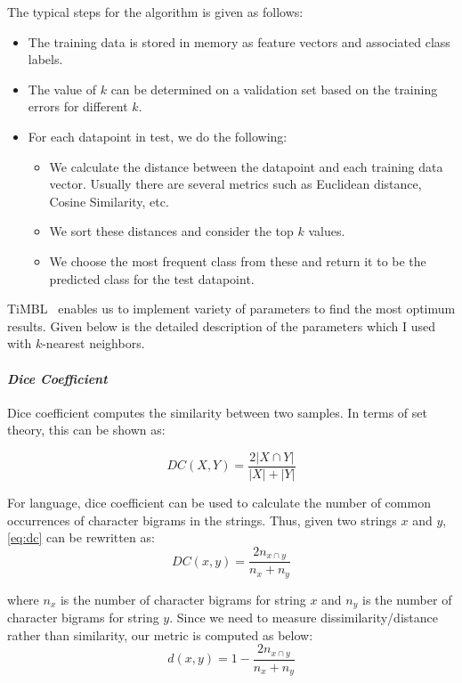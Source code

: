  The typical steps for the algorithm is given as follows:

\begin{itemize}
    \item  The training data is stored in memory as feature vectors and associated class labels.
    \item The value of $k$ can be determined on a validation set based on the training errors for different $k$.
    \item For each datapoint in test, we do the following:
    \begin{itemize}
        \item We calculate the distance between the datapoint and each training data vector. Usually there are several metrics such as Euclidean distance, Cosine Similarity, etc.
        \item We sort these distances and consider the top $k$ values. 
        \item We choose the most frequent class from these and return it to be the predicted class for the test datapoint.
    \end{itemize}
\end{itemize}

TiMBL~\citep{daelemans1998timbl} enables us to implement variety of parameters to find the most optimum results. Given below is the detailed description of the parameters which I used with $k$-nearest neighbors.

\paragraph*{\textit{Dice Coefficient}}

Dice coefficient computes the similarity between two samples. In terms of set theory, this can be shown as:

\begin{equation} \label{eq:dc}
    DC(X,Y) ={\frac {2|X\cap Y|}{|X|+|Y|}}
\end{equation}

For language, dice coefficient can be used to calculate the number of common occurrences of character bigrams in the strings. Thus, given two strings $x$ and $y$, \ref{eq:dc} can be rewritten as:
\begin{equation}
    DC(x,y) = \frac{2n_{x \cap y}}{n_x + n_y}
\end{equation}

where $n_x$ is the number of character bigrams for string $x$ and $n_y$ is the number of character bigrams for string $y$.
Since we need to measure dissimilarity/distance rather than similarity, our metric is computed as below:
\begin{equation}
    d(x,y) = 1 - { \frac{2n_{x \cap y}}{n_x + n_y}}
\end{equation}

